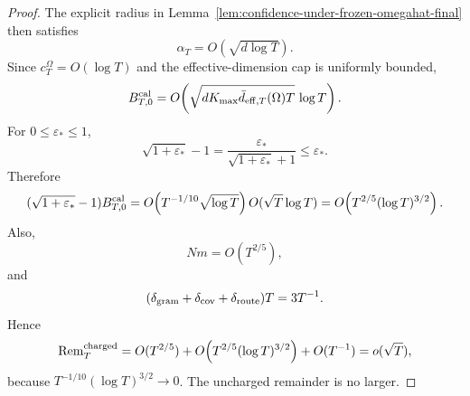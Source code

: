 \documentclass{article} %
\begin{document}
\begin{proof}
The explicit radius in
Lemma~\ref{lem:confidence-under-frozen-omegahat-final} then satisfies
\[
\alpha_T=O(\sqrt{d\log T}).
\]
Since \(c_T^\Omega=O(\log T)\) and the effective-dimension cap is uniformly
bounded,
\[
B_{T,0}^{\rm cal}
=
O\!\left(
\sqrt{dK_{\max}\bar d_{\mathrm{eff},T}(\Omega)T}\,\log T
\right).
\]
For \(0\le\varepsilon_*\le1\),
\[
\sqrt{1+\varepsilon_*}-1
=
\frac{\varepsilon_*}{\sqrt{1+\varepsilon_*}+1}
\le
\varepsilon_*.
\]
Therefore
\[
(\sqrt{1+\varepsilon_*}-1)B_{T,0}^{\rm cal}
=
O\!\left(T^{-1/10}\sqrt{\log T}\right)
O(\sqrt{T}\log T)
=
O\!\left(T^{2/5}(\log T)^{3/2}\right).
\]
Also,
\[
Nm=O(T^{2/5}),
\]
and
\[
(\delta_{\rm gram}+\delta_{\rm cov}+\delta_{\rm route})T
=
3T^{-1}.
\]
Hence
\[
\operatorname{Rem}_T^{\rm charged}
=
O(T^{2/5})
+
O\!\left(T^{2/5}(\log T)^{3/2}\right)
+
O(T^{-1})
=
o(\sqrt T),
\]
because
\(T^{-1/10}(\log T)^{3/2}\to0\). The uncharged remainder is no larger.
\end{proof}



\end{document}
